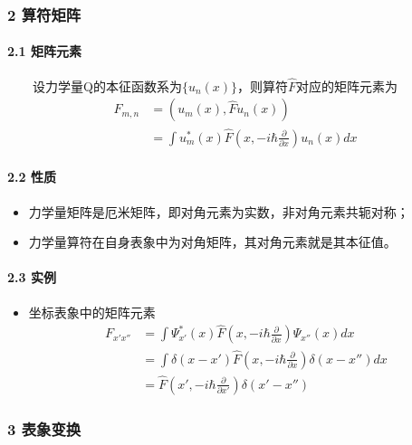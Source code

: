 \documentclass[UTF8,twocolumn]{ctexart}
\providecommand{\tightlist}{%
  \setlength{\itemsep}{0pt}\setlength{\parskip}{0pt}}
\let\oldparagraph\paragraph
\renewcommand{\paragraph}[1]{\oldparagraph{#1}\mbox{}}
\begin{document}
\hypertarget{ux7b97ux7b26ux77e9ux9635}{%
\subsubsection{2 算符矩阵}\label{ux7b97ux7b26ux77e9ux9635}}

\hypertarget{ux77e9ux9635ux5143ux7d20}{%
\paragraph{ 2.1 矩阵元素}\label{ux77e9ux9635ux5143ux7d20}}

  设力学量Q的本征函数系为\(\{u_n(x)\}\)，则算符\(\hat{F}\)对应的矩阵元素为
\[\begin{aligned}
F_{m,n}&=(u_m(x),\hat{F}u_n(x))\\
&=\int u_m^*(x)\hat{F}(x,-i\hbar\frac{\partial}{\partial x})u_n(x)dx
\end{aligned}\]

\hypertarget{ux6027ux8d28}{%
\paragraph{ 2.2 性质}\label{ux6027ux8d28}}

\begin{itemize}
\tightlist
\item
  力学量矩阵是厄米矩阵，即对角元素为实数，非对角元素共轭对称；
\item
  力学量算符在自身表象中为对角矩阵，其对角元素就是其本征值。
\end{itemize}

\hypertarget{ux5b9eux4f8b}{%
\paragraph{ 2.3 实例}\label{ux5b9eux4f8b}}

\begin{itemize}
\tightlist
\item
  坐标表象中的矩阵元素 \[\begin{aligned}
    F_{x'x''}&=\int\Psi_{x'}^*(x)\hat{F}(x,-i\hbar\frac{\partial}{\partial x})\Psi_{x''}(x)dx\\
    &=\int\delta(x-x')\hat{F}(x,-i\hbar\frac{\partial}{\partial x})\delta(x-x'')dx\\
    &=\hat{F}(x',-i\hbar\frac{\partial}{\partial x'})\delta(x'-x'')
  \end{aligned}\]
\end{itemize}

\hypertarget{ux8868ux8c61ux53d8ux6362}{%
\subsubsection{3 表象变换}\label{ux8868ux8c61ux53d8ux6362}}
\end{document}

